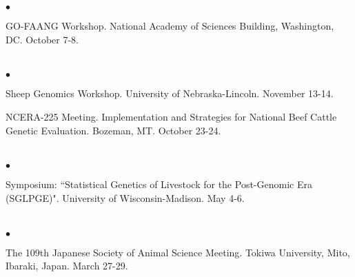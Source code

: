 \documentclass[margin,line,10pt]{res}
\newenvironment{list2}{
  \begin{list}{$\bullet$}{%
      \setlength{\itemsep}{0in}
      \setlength{\parsep}{0in} \setlength{\parskip}{0in}
      \setlength{\topsep}{0in} \setlength{\partopsep}{0in} 
      \setlength{\leftmargin}{0.2in}}}{\end{list}}
\begin{document}
\begin{resume}
\begin{list2}
  \vspace{0.5cm}
  
\item GO-FAANG Workshop. National Academy of Sciences Building, Washington, DC. October 7-8. 
\end{list2}  

\section{}
\begin{list2}

\item Sheep Genomics Workshop. University of Nebraska-Lincoln. November 13-14.  

\vspace{0.5cm}

\item NCERA-225 Meeting. Implementation and Strategies for National Beef Cattle Genetic Evaluation. Bozeman, MT. October 23-24. 

\end{list2}  




\section{}
\begin{list2}
\item Symposium: ``Statistical Genetics of Livestock for the Post-Genomic Era (SGLPGE)". University of Wisconsin-Madison. May 4-6. 
\end{list2}  

\section{}
\begin{list2}
\item  The 109th Japanese Society of Animal Science Meeting. Tokiwa University, Mito, Ibaraki, Japan. March 27-29. 

\end{list2}










\vspace{0.5cm}

\end{resume}
\end{document}
